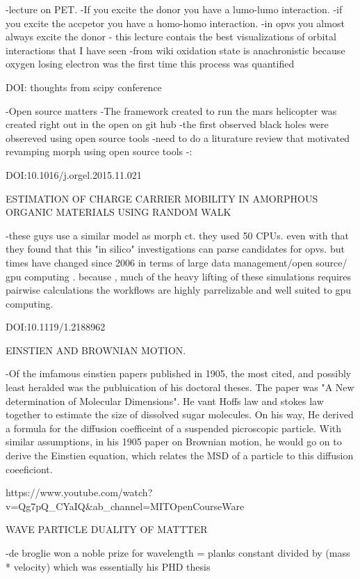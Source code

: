     -lecture on PET. 
    -If you excite the donor you have a lumo-lumo interaction.
    -if you excite the accpetor you have a homo-homo interaction.
    -in opvs you almost always excite the donor
    - this lecture contais the best visualizations of orbital interactions that I have seen
    -from wiki oxidation state is anachronistic because oxygen losing electron was the first time
    this process was quantified


DOI: thoughts from scipy conference

    -Open source matters
    -The framework created to run the mars helicopter was created right out in the open on git hub
    -the first observed black holes were obsereved using open source tools
    -need to do a liturature review that motivated revamping morph using open source tools
    -:


DOI:10.1016/j.orgel.2015.11.021
    
    ESTIMATION OF CHARGE CARRIER MOBILITY IN AMORPHOUS ORGANIC MATERIALS USING RANDOM WALK


        -these guys use a similar model as morph ct. they used 50 CPUs. even with that they found
        that this "in silico" investigations can parse candidates for opvs. but times have changed since 
        2006 in terms of large data management/open source/ gpu computing . because , much of the heavy lifting
        of these simulations requires pairwise calculations the workflows are highly parrelizable and well
        suited to gpu computing.


DOI:10.1119/1.2188962

    EINSTIEN AND BROWNIAN MOTION. 

    -Of the imfamous einstien papers published in 1905, the most cited, and possibly least heralded was the 
    publuication of his doctoral theses. The paper was "A New determination of Molecular Dimensions". He 
    vant Hoffs law and stokes law together to estimate the size of dissolved sugar molecules. On his way, He 
    derived a formula for the diffusion coefficeint of a suspended picroscopic particle. With similar assumptions, 
    in his 1905 paper on Brownian motion, he would go on to derive the Einstien equation, which relates the
    MSD of a particle to this diffusion coeeficiont. 

https://www.youtube.com/watch?v=Qg7pQ_CYaIQ&ab_channel=MITOpenCourseWare

    WAVE PARTICLE DUALITY OF MATTTER

    -de broglie won a noble prize for wavelength = planks constant divided by (mass * velocity) which was 
    essentially his PHD thesis

